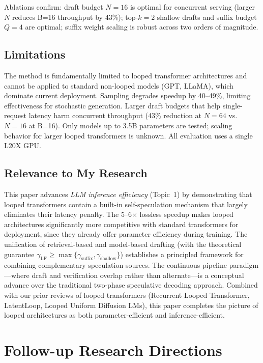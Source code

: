 \documentclass[11pt,a4paper]{article}
\begin{document}
Ablations confirm: draft budget $N{=}16$ is optimal for concurrent serving (larger $N$ reduces B=16 throughput by 43\%); top-$k{=}2$ shallow drafts and suffix budget $Q{=}4$ are optimal; suffix weight scaling is robust across two orders of magnitude.

\subsection{Limitations}
The method is fundamentally limited to looped transformer architectures and cannot be applied to standard non-looped models (GPT, LLaMA), which dominate current deployment. Sampling degrades speedup by 40--49\%, limiting effectiveness for stochastic generation. Larger draft budgets that help single-request latency harm concurrent throughput (43\% reduction at $N{=}64$ vs.\ $N{=}16$ at B=16). Only models up to 3.5B parameters are tested; scaling behavior for larger looped transformers is unknown. All evaluation uses a single L20X GPU.

\subsection{Relevance to My Research}
This paper advances \emph{LLM inference efficiency} (Topic~1) by demonstrating that looped transformers contain a built-in self-speculation mechanism that largely eliminates their latency penalty. The 5--6$\times$ lossless speedup makes looped architectures significantly more competitive with standard transformers for deployment, since they already offer parameter efficiency during training. The unification of retrieval-based and model-based drafting (with the theoretical guarantee $\gamma_{\mathrm{LF}} \geq \max\{\gamma_{\mathrm{suffix}}, \gamma_{\mathrm{shallow}}\}$) establishes a principled framework for combining complementary speculation sources. The continuous pipeline paradigm---where draft and verification overlap rather than alternate---is a conceptual advance over the traditional two-phase speculative decoding approach. Combined with our prior reviews of looped transformers (Recurrent Looped Transformer, LatentLoop, Looped Uniform Diffusion LMs), this paper completes the picture of looped architectures as both parameter-efficient and inference-efficient.

\section{Follow-up Research Directions}
\end{document}
